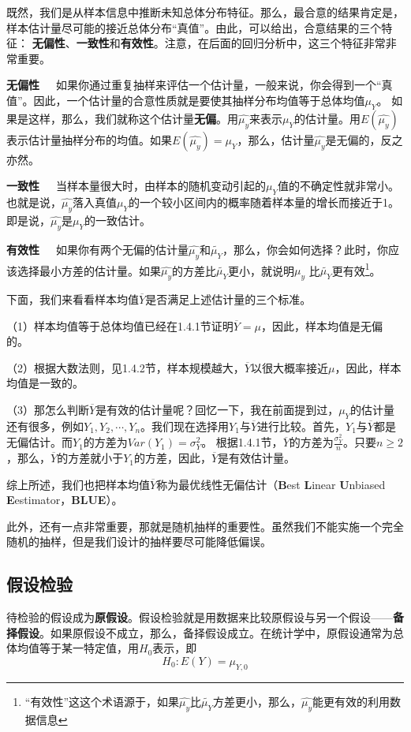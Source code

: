 \documentclass[cn,12pt,math=newtx,citestyle=gb7714-2015,bibstyle=gb7714-2015]{elegantbook}
\begin{document}
	既然，我们是从样本信息中推断未知总体分布特征。那么，最合意的结果肯定是，样本估计量尽可能的接近总体分布“真值”。由此，可以给出，合意结果的三个特征：
	\textbf{无偏性}、\textbf{一致性}和\textbf{有效性}。注意，在后面的回归分析中，这三个特征非常非常重要。
	
	\textbf{无偏性}~~~如果你通过重复抽样来评估一个估计量，一般来说，你会得到一个“真值”。因此，一个估计量的合意性质就是要使其抽样分布均值等于总体均值$\mu_Y$。 如果是这样，那么，我们就称这个估计量\textbf{无偏}。用$\hat{\mu_y}$来表示$\mu_Y$的估计量。用$E(\hat{\mu_y})$表示估计量抽样分布的均值。如果$E(\hat{\mu_y})=\mu_Y$，那么，估计量$\hat{\mu_y}$是无偏的，反之亦然。
	
	\textbf{一致性}~~~当样本量很大时，由样本的随机变动引起的$\mu_Y$值的不确定性就非常小。也就是说，$\hat{\mu_y}$落入真值$\mu_Y$的一个较小区间内的概率随着样本量的增长而接近于1。即是说，$\hat{\mu_y}$是$\mu_Y$的一致估计。
	
	\textbf{有效性}~~~如果你有两个无偏的估计量$\hat{\mu_y}$和$\tilde{\mu_Y}$，那么，你会如何选择？此时，你应该选择最小方差的估计量。如果$\hat{\mu_y}$的方差比$\tilde{\mu_Y}$更小，就说明$\hat{\mu_y}$ 比$\tilde{\mu_Y}$更有效\footnote{“有效性”这这个术语源于，如果$\hat{\mu_y}$比$\tilde{\mu_Y}$方差更小，那么，$\hat{\mu_y}$能更有效的利用数据信息}。
	
	下面，我们来看看样本均值$\overline{Y}$是否满足上述估计量的三个标准。
	
	（1）样本均值等于总体均值已经在1.4.1节证明$\overline{Y}=\mu$，因此，样本均值是无偏的。
	
	（2）根据大数法则，见1.4.2节，样本规模越大，$\overline{Y}$以很大概率接近$\mu$，因此，样本均值是一致的。
	
	（3）那怎么判断$\overline{Y}$是有效的估计量呢？回忆一下，我在前面提到过，$\mu_Y$的估计量还有很多，例如$Y_1,Y_2,\cdots,Y_n$。我们现在选择用$Y_1$与$\overline{Y}$进行比较。首先，$Y_1$与$\overline{Y}$都是无偏估计。而$Y_1$的方差为$Var(Y_1)=\sigma_Y^2$。 根据1.4.1节，$\overline{Y}$的方差为$\frac{\sigma_Y^2}{n}$。只要$n\ge2$，那么，$\overline{Y}$的方差就小于$Y_1$的方差，因此，$\overline{Y}$是有效估计量。
	
	综上所述，我们也把样本均值$\overline{Y}$称为最优线性无偏估计（\textbf{B}est \textbf{L}inear \textbf{U}nbiased \textbf{E}estimator，\textbf{BLUE}）。
	
	此外，还有一点非常重要，那就是随机抽样的重要性。虽然我们不能实施一个完全随机的抽样，但是我们设计的抽样要尽可能降低偏误。
	
	\subsection{假设检验}
	待检验的假设成为\textbf{原假设}。假设检验就是用数据来比较原假设与另一个假设——\textbf{备择假设}。如果原假设不成立，那么，备择假设成立。在统计学中，原假设通常为总体均值等于某一特定值，用$H_0$表示，即
	\begin{equation}
		H_0:E(Y)=\mu_{Y,0}
	\end{equation}
	
\end{document}
